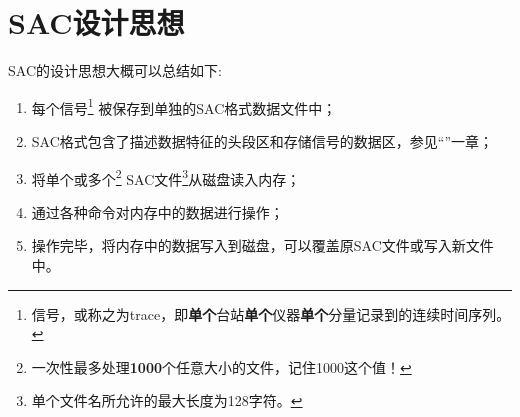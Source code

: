 \section{SAC设计思想}
SAC的设计思想大概可以总结如下:
\begin{enumerate}
    \item 每个信号\footnote{信号，或称之为trace，即\textbf{单个}台站\textbf{单个}仪器\textbf{单个}分量记录到的连续时间序列。}
被保存到单独的SAC格式数据文件中；
\item SAC格式包含了描述数据特征的头段区和存储信号的数据区，参见``''一章；
\item 将单个或多个\footnote{一次性最多处理\textbf{1000}个任意大小的文件，记住1000这个值！}
    SAC文件\footnote{单个文件名所允许的最大长度为128字符。}从磁盘读入内存；
\item 通过各种命令对内存中的数据进行操作；
\item 操作完毕，将内存中的数据写入到磁盘，可以覆盖原SAC文件或写入新文件中。
\end{enumerate}
